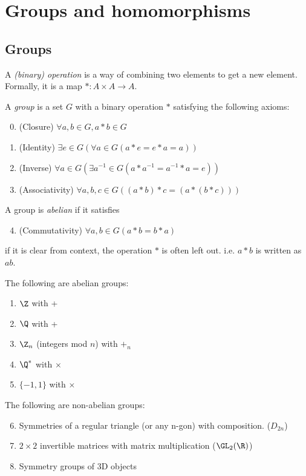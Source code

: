 \documentclass[a4pape]{article}
\begin{document}
\section{Groups and homomorphisms}
\subsection{Groups}
\begin{defi}
  A \emph{(binary) operation} is a way of combining two elements to get a new element. Formally, it is a map $*: A \times A \rightarrow A$.
\end{defi}
\begin{defi}[Group]
  A \emph{group} is a set $G$ with a binary operation $*$ satisfying the following axioms:
  \begin{enumerate}[label=\arabic{*}.]
    \setcounter{enumi}{-1}
  \item (Closure) $\forall a, b\in G, a*b\in G$
  \item (Identity) $\exists e\in G(\forall a\in G (a*e = e*a = a))$
  \item (Inverse) $\forall a\in G(\exists a^{-1}\in G (a*a^{-1} = a^{-1}*a = e))$
  \item (Associativity) $\forall a, b, c\in G( (a*b)*c = (a*(b*c)))$
  \end{enumerate}
\end{defi}
\begin{defi}
  A group is \emph{abelian} if it satisfies
  \begin{enumerate}[label=\arabic{*}.]
    \setcounter{enumi}{3}
  \item (Commutativity) $\forall a, b\in G (a*b = b*a)$
  \end{enumerate}
\end{defi}
\note if it is clear from context, the operation $*$ is often left out. i.e. $a*b$ is written as $ab$.
\begin{eg}
  The following are abelian groups:
  \begin{enumerate}
  \item $\Z$ with +
  \item $\Q$ with +
  \item $\Z_n$ (integers mod $n$) with $+_n$
  \item $\Q^*$ with $\times$
  \item $\{-1, 1\}$ with $\times$
  \end{enumerate}
  The following are non-abelian groups:
  \begin{enumerate}
    \setcounter{enumi}{5}
  \item Symmetries of a regular triangle (or any n-gon) with composition. ($D_{2n}$)
  \item $2\times 2$ invertible matrices with matrix multiplication ($\GL_2(\R)$)
  \item Symmetry groups of 3D objects
  \end{enumerate}
\end{eg}
\end{document}
